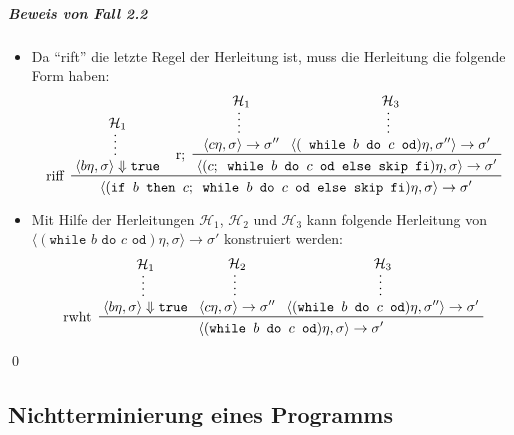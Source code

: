 																\subparagraph{Beweis von Fall 2.2}
																	\begin{itemize}
																		\item Da \enquote{rift} die letzte Regel der Herleitung ist, muss die Herleitung die folgende Form haben:
																			\begin{equation*}
																				\prftree[l]
																				{ riff }
																				{ \prfsummary{\mathcal{H} _ 1}{\langle b\eta, \sigma \rangle \Downarrow \texttt{true}} }
																				{
																					\prftree[l]
																					{ r; }
																					{ \prfsummary{\mathcal{H} _ 1}{\langle c\eta, \sigma \rangle \rightarrow \sigma''} }
																					{ \prfsummary{\mathcal{H} _ 3}{\langle (\texttt{ while } b \texttt{ do } c \texttt{ od})\eta, \sigma'' \rangle \rightarrow \sigma' } }
																					{ \langle (c ; \texttt{ while } b \texttt{ do } c \texttt{ od else skip fi}) \eta, \sigma \rangle \rightarrow \sigma' }
																				}
																				{ \langle (\texttt{if } b \texttt{ then } c ; \texttt{ while } b \texttt{ do } c \texttt{ od else skip fi})\eta, \sigma \rangle \rightarrow \sigma' }
																			\end{equation*}
																		\item Mit Hilfe der Herleitungen $ \mathcal{H} _ 1 $, $ \mathcal{H} _ 2 $ und $ \mathcal{H} _ 3 $ kann folgende Herleitung von \\ $ \langle (\texttt{while } b \texttt{ do } c \texttt{ od}) \eta, \sigma \rangle \rightarrow \sigma' $ konstruiert werden:
																			\begin{equation*}
																				\prftree[l]
																				{ rwht }
																				{ \prfsummary{\mathcal{H} _ 1}{\langle b\eta, \sigma \rangle \Downarrow \texttt{true}} }
																				{ \prfsummary{\mathcal{H} _ 2}{\langle c\eta, \sigma \rangle \rightarrow \sigma''} }
																				{ \prfsummary{\mathcal{H} _ 3}{\langle (\texttt{while } b \texttt{ do } c \texttt{ od}) \eta, \sigma'' \rangle \rightarrow \sigma'}  }
																				{ \langle (\texttt{while } b \texttt{ do } c \texttt{ od}) \eta, \sigma \rangle \rightarrow \sigma' }
																			\end{equation*}
																	\end{itemize}

																	\qed

														\subsection{Nichtterminierung eines Programms}
